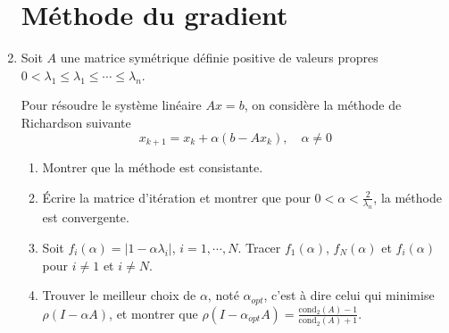 \documentclass[a4paper]{article}
\begin{document}
\begin{enumerate}
\section{Méthode du gradient}
\item Soit $A$ une matrice symétrique définie positive de valeurs propres
$0 < \lambda_1 \leq \lambda_1 \leq \cdots  \leq\lambda_n$.

 Pour résoudre le système linéaire $Ax = b$, on considère la méthode de Richardson suivante
\[x_{k+1} = x_k + \alpha (b - Ax_k),\quad \alpha \neq 0\]
\begin{enumerate}
\item Montrer que la méthode est consistante.
\item Écrire la matrice d'itération et montrer que pour $0 < \alpha  < \frac 2{\lambda_n}$, la méthode est convergente.
\item Soit $f_i(\alpha) = |1 -\alpha\lambda_i|$, $i = 1,\cdots,N$. Tracer $f_1(\alpha)$, $f_N(\alpha)$ et $f_i(\alpha)$ pour $i \neq 1$ et $i \neq N$.
\item Trouver le meilleur choix de $\alpha$, noté $\alpha_{opt}$, c'est à dire celui qui minimise $\rho(I - \alpha A)$, et montrer que $\rho(I - \alpha_{opt} A) =\frac{ \mbox{cond}_2(A)-1}{\mbox{cond}_2(A)+1}$.

\end{enumerate}






\end{enumerate}
\end{document}
